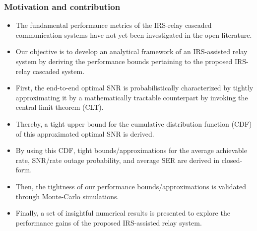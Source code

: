\documentclass[article,mathserif,10pt,envcountsect]{beamer}
\begin{document}
\begin{frame}
\frametitle{Motivation and contribution}
\begin{itemize}
	\item The fundamental performance metrics of  the IRS-relay cascaded   communication systems have not yet been investigated in the open literature. 
	
	\item Our objective is to develop an analytical framework of an IRS-assisted relay system by deriving the performance bounds	pertaining to the proposed IRS-relay cascaded system. 
	
	\item First,  the end-to-end optimal SNR is probabilistically characterized by tightly approximating it by a mathematically tractable counterpart by invoking the central limit theorem (CLT). 
	
	\item Thereby, a tight upper bound for the cumulative distribution function (CDF) of this approximated optimal SNR is derived. 
	
	\item By using this CDF, tight bounds/approximations for the average achievable rate, SNR/rate outage probability, and average SER  are derived in closed-form.
	
	\item Then, the tightness of our performance bounds/approximations  is validated through  Monte-Carlo simulations.
	
	\item Finally, a set of insightful numerical results is presented  to explore the performance gains of the proposed IRS-assisted relay system. 
	

\end{itemize}

\end{frame}
\end{document}
